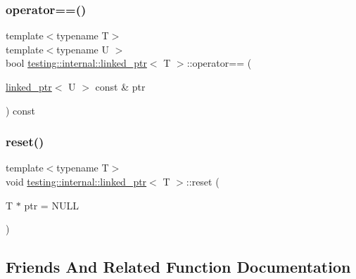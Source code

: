 \subsubsection{\texorpdfstring{operator==()}{operator==()}\hspace{0.1cm}{\footnotesize\ttfamily [2/2]}}
{\footnotesize\ttfamily template$<$typename T$>$ \\
template$<$typename U $>$ \\
bool \mbox{\hyperlink{classtesting_1_1internal_1_1linked__ptr}{testing\+::internal\+::linked\+\_\+ptr}}$<$ T $>$\+::operator== (\begin{DoxyParamCaption}\item[{\mbox{\hyperlink{classtesting_1_1internal_1_1linked__ptr}{linked\+\_\+ptr}}$<$ U $>$ const \&}]{ptr }\end{DoxyParamCaption}) const\hspace{0.3cm}{\ttfamily [inline]}}

\mbox{\label{classtesting_1_1internal_1_1linked__ptr_a95ba3b7b66ed0193c779976c6e126ab6}} 
\subsubsection{\texorpdfstring{reset()}{reset()}}
{\footnotesize\ttfamily template$<$typename T$>$ \\
void \mbox{\hyperlink{classtesting_1_1internal_1_1linked__ptr}{testing\+::internal\+::linked\+\_\+ptr}}$<$ T $>$\+::reset (\begin{DoxyParamCaption}\item[{T $\ast$}]{ptr = {\ttfamily NULL} }\end{DoxyParamCaption})\hspace{0.3cm}{\ttfamily [inline]}}



\subsection{Friends And Related Function Documentation}
\mbox{\label{classtesting_1_1internal_1_1linked__ptr_a7763f286ca03a7f7363a033d996c8c1c}} 

